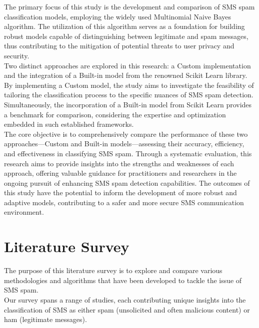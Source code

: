 \documentclass[12pt]{article}
\begin{document}
The primary focus of this study is the development and comparison of SMS spam classification models, employing the widely used Multinomial Naive Bayes algorithm. The utilization of this algorithm serves as a foundation for building robust models capable of distinguishing between legitimate and spam messages, thus contributing to the mitigation of potential threats to user privacy and security.\\

Two distinct approaches are explored in this research: a Custom implementation and the integration of a Built-in model from the renowned Scikit Learn library. By implementing a Custom model, the study aims to investigate the feasibility of tailoring the classification process to the specific nuances of SMS spam detection. Simultaneously, the incorporation of a Built-in model from Scikit Learn provides a benchmark for comparison, considering the expertise and optimization embedded in such established frameworks.\\

The core objective is to comprehensively compare the performance of these two approaches—Custom and Built-in models—assessing their accuracy, efficiency, and effectiveness in classifying SMS spam. Through a systematic evaluation, this research aims to provide insights into the strengths and weaknesses of each approach, offering valuable guidance for practitioners and researchers in the ongoing pursuit of enhancing SMS spam detection capabilities. The outcomes of this study have the potential to inform the development of more robust and adaptive models, contributing to a safer and more secure SMS communication environment.


\section{Literature Survey}

The purpose of this literature survey is to explore and compare various methodologies and algorithms that have been developed to tackle the issue of SMS spam.\\

Our survey spans a range of studies, each contributing unique insights into the classification of SMS as either spam (unsolicited and often malicious content) or ham (legitimate messages).
\end{document}
